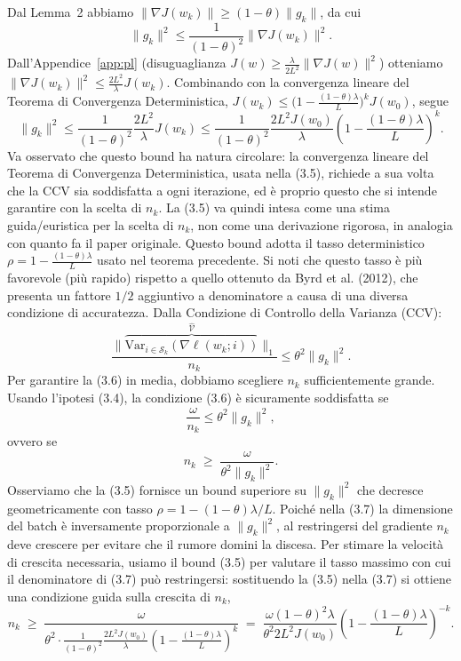 \documentclass[a4paper,12pt]{article}
\begin{document}
Dal Lemma~2 abbiamo $\|\nabla J(w_k)\|\ge(1-\theta)\|g_k\|$,
da cui
\[
\|g_k\|^2\le\frac{1}{(1-\theta)^2}\|\nabla J(w_k)\|^2.
\]
Dall'Appendice~\ref{app:pl} (disuguaglianza $J(w)\ge\frac{\lambda}{2L^2}\|\nabla J(w)\|^2$)
otteniamo $\|\nabla J(w_k)\|^2\le\frac{2L^2}{\lambda}J(w_k)$.
Combinando con la convergenza lineare del Teorema di Convergenza Deterministica,
$J(w_k)\le\bigl(1-\frac{(1-\theta)\lambda}{L}\bigr)^k J(w_0)$, segue
\[
\|g_k\|^2\le\frac{1}{(1-\theta)^2}\frac{2L^2}{\lambda}J(w_k)
\le\frac{1}{(1-\theta)^2}\frac{2L^2 J(w_0)}{\lambda}
\left(1-\frac{(1-\theta)\lambda}{L}\right)^k.
\tag{3.5}\label{eq:bound_gk}
\]
Va osservato che questo bound ha natura circolare: la convergenza lineare del Teorema di Convergenza Deterministica, usata nella (3.5), richiede a sua volta che la CCV sia soddisfatta a ogni iterazione, ed è proprio questo che si intende garantire con la scelta di $n_k$. La (3.5) va quindi intesa come una stima guida/euristica per la scelta di $n_k$, non come una derivazione rigorosa, in analogia con quanto fa il paper originale.
Questo bound adotta il tasso deterministico $\rho=1-\frac{(1-\theta)\lambda}{L}$ usato nel teorema precedente.  Si noti che questo tasso è più favorevole (più rapido) rispetto a quello ottenuto da Byrd et al. (2012), che presenta un fattore $1/2$ aggiuntivo a denominatore a causa di una diversa condizione di accuratezza.
Dalla Condizione di Controllo della Varianza (CCV):
\[
\frac{\|\overbrace{\mathrm{Var}_{i\in\mathcal{S}_k}(\nabla \ell(w_k;i))}^{\widehat{\mathcal{V}}}\|_1}{n_k} \le \theta^2 \|g_k\|^2. \tag{3.6}\]
Per garantire la (3.6) in media, dobbiamo scegliere \(n_k\) sufficientemente grande. Usando l'ipotesi (3.4), la condizione (3.6) è sicuramente soddisfatta se
\[
\frac{\omega}{n_k} \le \theta^2 \|g_k\|^2,
\]
ovvero se
\[
n_k \;\ge\; \frac{\omega}{\theta^2 \|g_k\|^2}. \tag{3.7}
\]
Osserviamo che la (3.5) fornisce un bound superiore su \(\|g_k\|^2\) che decresce geometricamente con tasso \(\rho = 1-(1-\theta)\lambda/L\). Poiché nella (3.7) la dimensione del batch è inversamente proporzionale a \(\|g_k\|^2\), al restringersi del gradiente \(n_k\) deve crescere per evitare che il rumore domini la discesa. Per stimare la velocità di crescita necessaria, usiamo il bound (3.5) per valutare il tasso massimo con cui il denominatore di (3.7) può restringersi: sostituendo la (3.5) nella (3.7) si ottiene una condizione guida sulla crescita di \(n_k\),
\[
n_k \;\ge\; \frac{\omega}{\theta^2 \cdot \frac{1}{(1-\theta)^2}\frac{2L^2 J(w_0)}{\lambda}\left(1 - \frac{(1-\theta)\lambda}{L}\right)^k}
\;=\; \frac{\omega (1-\theta)^2 \lambda}{\theta^2 2L^2 J(w_0)}
\left(1 - \frac{(1-\theta)\lambda}{L}\right)^{-k}. \tag{3.8}
\]
\end{document}
